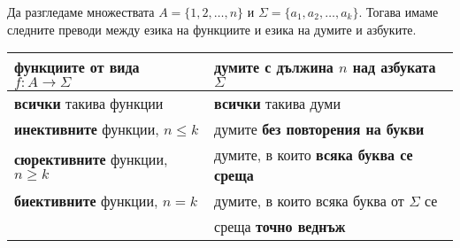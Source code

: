 \newpage

\begin{remark}
  Да разгледаме множествата $A=\{1,2,\dots,n\}$ и $\Sigma = \{a_1,a_2,\dots,a_k\}$.
  Тогава имаме следните преводи между езика на функциите и езика на думите и азбуките.
  \newline
  \begin{tabular}{|l|l|}
    \hline
    функциите от вида $f:A\to \Sigma$ & думите с дължина $n$ над азбуката $\Sigma$ \\
    \hline
    \hline
    {\bf всички} такива функции & {\bf всички} такива думи\\
    \hline
    {\bf инективните} функции, $n \leq k$ & думите  {\bf без повторения на букви} \\
    \hline
    {\bf сюрективните} функции, $n \geq k$ & думите, в които {\bf всяка буква се среща} \\
    \hline
    {\bf биективните} функции, $n = k$ & думите, в които всяка буква от $\Sigma$ се \\
    & среща {\bf точно веднъж} \\
    \hline
  \end{tabular}


\end{remark}


